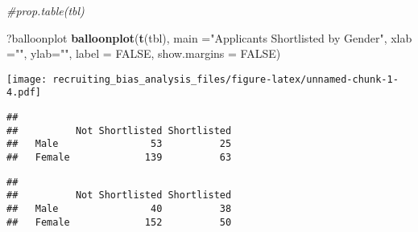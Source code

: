 \documentclass[]{article}
\newenvironment{Shaded}{\begin{snugshade}}{\end{snugshade}}
\newcommand{\KeywordTok}[1]{\textcolor[rgb]{0.13,0.29,0.53}{\textbf{#1}}}
\newcommand{\DataTypeTok}[1]{\textcolor[rgb]{0.13,0.29,0.53}{#1}}
\newcommand{\DecValTok}[1]{\textcolor[rgb]{0.00,0.00,0.81}{#1}}
\newcommand{\FloatTok}[1]{\textcolor[rgb]{0.00,0.00,0.81}{#1}}
\newcommand{\StringTok}[1]{\textcolor[rgb]{0.31,0.60,0.02}{#1}}
\newcommand{\CommentTok}[1]{\textcolor[rgb]{0.56,0.35,0.01}{\textit{#1}}}
\newcommand{\OtherTok}[1]{\textcolor[rgb]{0.56,0.35,0.01}{#1}}
\newcommand{\OperatorTok}[1]{\textcolor[rgb]{0.81,0.36,0.00}{\textbf{#1}}}
\newcommand{\NormalTok}[1]{#1}
\begin{document}
\begin{Shaded}
\begin{Highlighting}[]
\CommentTok{#prop.table(tbl)}

\NormalTok{?balloonplot}
\KeywordTok{balloonplot}\NormalTok{(}\KeywordTok{t}\NormalTok{(tbl), }\DataTypeTok{main =}\StringTok{"Applicants Shortlisted by Gender"}\NormalTok{, }\DataTypeTok{xlab =}\StringTok{""}\NormalTok{, }\DataTypeTok{ylab=}\StringTok{""}\NormalTok{,}
            \DataTypeTok{label =} \OtherTok{FALSE}\NormalTok{, }\DataTypeTok{show.margins =} \OtherTok{FALSE}\NormalTok{)}
\end{Highlighting}
\end{Shaded}

\texttt{[image: recruiting\_bias\_analysis\_files/figure-latex/unnamed-chunk-1-4.pdf]}

\begin{Shaded}
\end{Shaded}

\begin{verbatim}
##         
##          Not Shortlisted Shortlisted
##   Male                53          25
##   Female             139          63
\end{verbatim}

\begin{Shaded}
\end{Shaded}

\begin{verbatim}
##         
##          Not Shortlisted Shortlisted
##   Male                40          38
##   Female             152          50
\end{verbatim}
\end{document}
